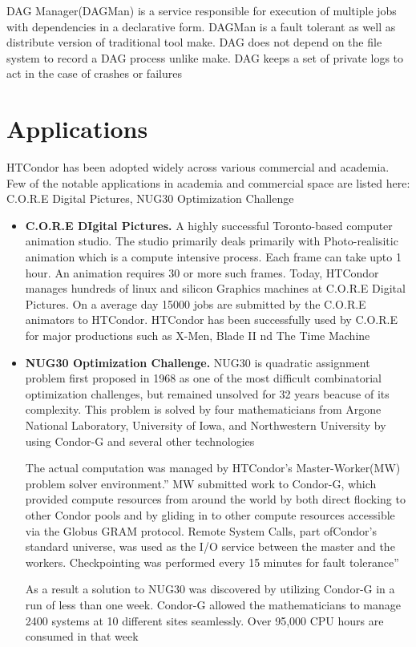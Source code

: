 \documentclass[9pt,twocolumn,twoside]{styles/osajnl}
\begin{document}
DAG Manager(DAGMan) is a service responsible for execution of multiple
jobs with dependencies in a declarative form. DAGMan is a fault
tolerant as well as distribute version of traditional tool make.  DAG
does not depend on the file system to record a DAG process unlike
make.  DAG keeps a set of private logs to act in the case of crashes
or failures



\section{Applications}
HTCondor has been adopted widely across various commercial and
academia. Few of the notable applications in academia and commercial
space are listed here: C.O.R.E Digital Pictures, NUG30 Optimization
Challenge


\begin{itemize}

\item{\bf C.O.R.E DIgital Pictures.} A highly successful Toronto-based
  computer animation studio. The studio primarily deals primarily with
  Photo-realisitic animation which is a compute intensive process.
  Each frame can take upto 1 hour. An animation requires 30 or more
  such frames. Today, HTCondor manages hundreds of linux and silicon
  Graphics machines at C.O.R.E Digital Pictures. On a average day
  15000 jobs are submitted by the C.O.R.E animators to
  HTCondor. HTCondor has been successfully used by C.O.R.E for major
  productions such as X-Men, Blade II nd The Time Machine

\item{\bf NUG30 Optimization Challenge.} NUG30 is quadratic assignment
  problem first proposed in 1968 as one of the most difficult
  combinatorial optimization challenges, but remained unsolved for 32
  years beacuse of its complexity. This problem is solved by four
  mathematicians from Argone National Laboratory, University of Iowa,
  and Northwestern University by using Condor-G and several other
  technologies

  The actual computation was managed by HTCondor's Master-Worker(MW)
  problem solver environment.'' MW submitted work to Condor-G, which
  provided compute resources from around the world by both direct
  flocking to other Condor pools and by gliding in to other compute
  resources accessible via the Globus GRAM protocol. Remote System
  Calls, part ofCondor’s standard universe, was used as the I/O
  service between the master and the workers. Checkpointing was
  performed every 15 minutes for fault
  tolerance''\cite{condor-practice}

 As a result a solution to NUG30 was discovered by utilizing Condor-G
 in a run of less than one week. Condor-G allowed the mathematicians
 to manage 2400 systems at 10 different sites seamlessly. Over 95,000
 CPU hours are consumed in that week\cite{condor-practice}
 
\end{itemize}
\end{document}
